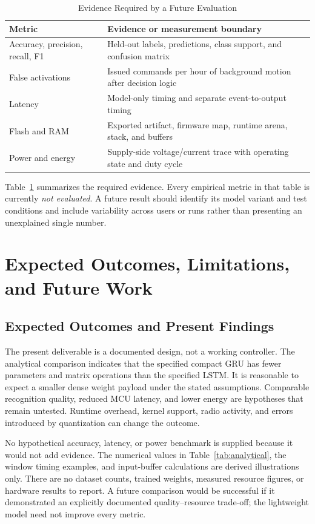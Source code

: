 \documentclass[conference]{IEEEtran}
\begin{document}
\begin{table}[t]
\caption{Evidence Required by a Future Evaluation}
\label{tab:evaluation}
\centering
\small
\begin{tabular}{@{}>{\raggedright\arraybackslash}p{}>{\raggedright\arraybackslash}p{}@{}}
\toprule
Metric & Evidence or measurement boundary\\
\midrule
Accuracy, precision, recall, F1 & Held-out labels, predictions, class support, and confusion matrix\\
False activations & Issued commands per hour of background motion after decision logic\\
Latency & Model-only timing and separate event-to-output timing\\
Flash and RAM & Exported artifact, firmware map, runtime arena, stack, and buffers\\
Power and energy & Supply-side voltage/current trace with operating state and duty cycle\\
\bottomrule
\end{tabular}
\end{table}

Table~\ref{tab:evaluation} summarizes the required evidence. Every empirical metric in that table is currently \emph{not evaluated}. A future result should identify its model variant and test conditions and include variability across users or runs rather than presenting an unexplained single number.

\section{Expected Outcomes, Limitations, and Future Work}
\subsection{Expected Outcomes and Present Findings}
The present deliverable is a documented design, not a working controller. The analytical comparison indicates that the specified compact GRU has fewer parameters and matrix operations than the specified LSTM. It is reasonable to expect a smaller dense weight payload under the stated assumptions. Comparable recognition quality, reduced MCU latency, and lower energy are hypotheses that remain untested. Runtime overhead, kernel support, radio activity, and errors introduced by quantization can change the outcome.

No hypothetical accuracy, latency, or power benchmark is supplied because it would not add evidence. The numerical values in Table~\ref{tab:analytical}, the window timing examples, and input-buffer calculations are derived illustrations only. There are no dataset counts, trained weights, measured resource figures, or hardware results to report. A future comparison would be successful if it demonstrated an explicitly documented quality--resource trade-off; the lightweight model need not improve every metric.
\end{document}
